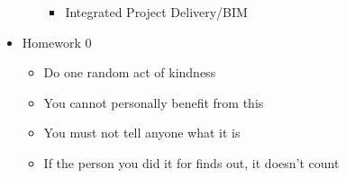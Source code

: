 \documentclass{article}
\begin{document}
\begin{itemize}
\begin{itemize}
\begin{itemize}
            \item Integrated Project Delivery/BIM
        \end{itemize}
    \end{itemize}
    \item Homework 0
    \begin{itemize}
        \item Do one random act of kindness
        \item You cannot personally benefit from this
        \item You must not tell anyone what it is
        \item If the person you did it for finds out, it doesn't count
    \end{itemize}
\end{itemize}
\end{document}
